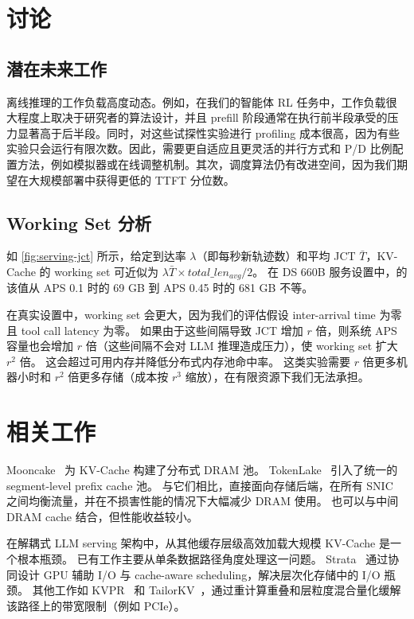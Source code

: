\section{讨论}
\label{sec:discussion}


\subsection{潜在未来工作}
\label{subsec:futurework}

离线推理的工作负载高度动态。例如，在我们的智能体 RL 任务中，工作负载很大程度上取决于研究者的算法设计，并且 prefill 阶段通常在执行前半段承受的压力显著高于后半段。同时，对这些试探性实验进行 profiling 成本很高，因为有些实验只会运行有限次数。因此，需要更自适应且更灵活的并行方式和 P/D 比例配置方法，例如模拟器或在线调整机制。其次，调度算法仍有改进空间，因为我们期望在大规模部署中获得更低的 TTFT 分位数。

\subsection{Working Set 分析}

如 \autoref{fig:serving-jct} 所示，给定到达率 $\lambda$（即每秒新轨迹数）和平均 JCT $\bar{T}$，KV-Cache 的 working set 可近似为 $\lambda \bar{T} \times total\_len_{avg}/2$。
在 DS 660B 服务设置中，\sysname 的该值从 APS 0.1 时的 69 GB 到 APS 0.45 时的 681 GB 不等。

在真实设置中，working set 会更大，因为我们的评估假设 inter-arrival time 为零且 tool call latency 为零。
如果由于这些间隔导致 JCT 增加 $r$ 倍，则系统 APS 容量也会增加 $r$ 倍（这些间隔不会对 LLM 推理造成压力），使 working set 扩大 $r^2$ 倍。
这会超过可用内存并降低分布式内存池命中率。
这类实验需要 $r$ 倍更多机器小时和 $r^2$ 倍更多存储（成本按 $r^3$ 缩放），在有限资源下我们无法承担。


\section{相关工作}

Mooncake~\cite{FAST25:Mooncake} 为 KV-Cache 构建了分布式 DRAM 池。
TokenLake~\cite{TokenLake} 引入了统一的 segment-level prefix cache 池。
与它们相比，\sysname 直接面向存储后端，在所有 SNIC 之间均衡流量，并在不损害性能的情况下大幅减少 DRAM 使用。
\sysname 也可以与中间 DRAM cache 结合，但性能收益较小。

在解耦式 LLM serving 架构中，从其他缓存层级高效加载大规模 KV-Cache 是一个根本瓶颈。
已有工作主要从单条数据路径角度处理这一问题。
Strata~\cite{Strata} 通过协同设计 GPU 辅助 I/O 与 cache-aware scheduling，解决层次化存储中的 I/O 瓶颈。
其他工作如 KVPR~\cite{ACL25:KVPR} 和 TailorKV~\cite{ACL25:TailorKV}，通过重计算重叠和层粒度混合量化缓解该路径上的带宽限制（例如 PCIe）。

